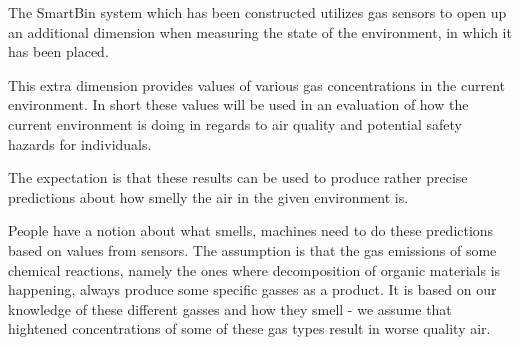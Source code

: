 The SmartBin system which has been constructed utilizes gas sensors to open up an additional dimension when measuring the state of the environment, in which it has been placed.

This extra dimension provides values of various gas concentrations in the current environment.
In short these values will be used in an evaluation of how the current environment is doing in regards to air quality and potential safety hazards for individuals.

The expectation is that these results can be used to produce rather precise predictions about how smelly the air in the given environment is.

People have a notion about what smells, machines need to do these predictions based on values from sensors.
The assumption is that the gas emissions of some chemical reactions, namely the ones where decomposition of organic materials is happening, always produce some specific gasses as a product.
It is based on our knowledge of these different gasses and how they smell - we assume that hightened concentrations of some of these gas types result in worse quality air.